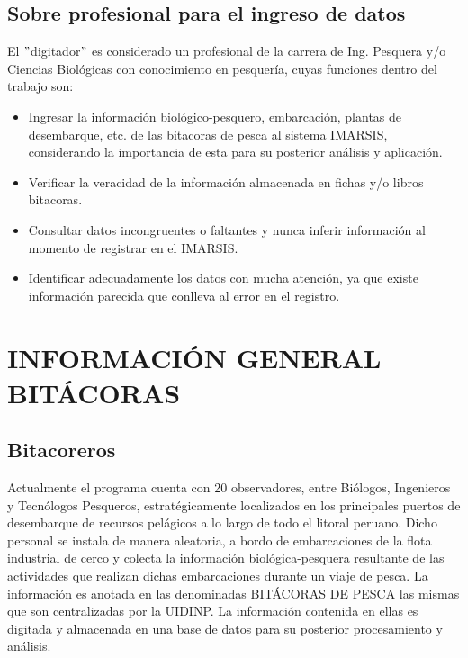\documentclass[a4paper,oneside,11pt]{book}
\begin{document}
\section{Sobre profesional para el ingreso de datos}
El $"$digitador$"$ es considerado un  profesional de la carrera de Ing. Pesquera y/o Ciencias Biológicas con conocimiento en pesquería, cuyas funciones dentro del trabajo son:
\begin{itemize}
\item Ingresar la información biológico-pesquero, embarcación, plantas de desembarque, etc. de las bitacoras de pesca al sistema IMARSIS, considerando la importancia de esta para su posterior análisis y aplicación.
\item Verificar la veracidad de la información almacenada en fichas y/o libros bitacoras.
\item Consultar datos incongruentes o faltantes y nunca inferir información al momento de registrar en el IMARSIS.
\item Identificar adecuadamente los datos con mucha atención, ya que existe información parecida que conlleva al error en el registro.\\
\end{itemize}



\chapter{INFORMACIÓN GENERAL BITÁCORAS}

\section{Bitacoreros}

Actualmente el programa cuenta con 20 observadores, entre Biólogos, Ingenieros y Tecnólogos Pesqueros, estratégicamente localizados en los principales puertos de desembarque de recursos pelágicos a lo largo de todo el litoral peruano.
Dicho personal se instala de manera aleatoria, a bordo de embarcaciones de la flota industrial de cerco y colecta la información  biológica-pesquera resultante de las actividades que realizan dichas embarcaciones durante un viaje de pesca.
La información es anotada en las denominadas BITÁCORAS DE PESCA las mismas que son centralizadas por la UIDINP. La información contenida en ellas es digitada y almacenada en una base de datos para su posterior procesamiento y análisis.
\end{document}

